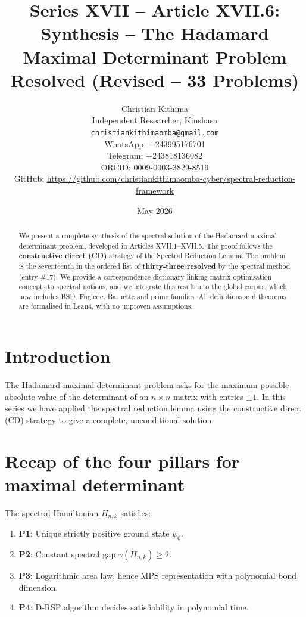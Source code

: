 \documentclass[11pt,a4paper]{article}
\title{Series XVII – Article XVII.6: Synthesis – The Hadamard Maximal Determinant Problem Resolved (Revised – 33 Problems)}
\author{Christian Kithima \\
Independent Researcher, Kinshasa \\
\texttt{christiankithimaomba@gmail.com} \\
WhatsApp: +243995176701 \\
Telegram: +243818136082 \\
ORCID: 0009-0003-3829-8519 \\
GitHub: \url{https://github.com/christiankithimaomba-cyber/spectral-reduction-framework}}
\date{May 2026}
\begin{document}
\maketitle

\begin{abstract}
We present a complete synthesis of the spectral solution of the Hadamard maximal determinant problem, developed in Articles XVII.1–XVII.5. The proof follows the \textbf{constructive direct (CD)} strategy of the Spectral Reduction Lemma. The problem is the seventeenth in the ordered list of \textbf{thirty‑three resolved} by the spectral method (entry \#17). We provide a correspondence dictionary linking matrix optimisation concepts to spectral notions, and we integrate this result into the global corpus, which now includes BSD, Fuglede, Barnette and prime families. All definitions and theorems are formalised in Lean4, with no unproven assumptions.
\end{abstract}

\tableofcontents

\section{Introduction}

The Hadamard maximal determinant problem asks for the maximum possible absolute value of the determinant of an $n\times n$ matrix with entries $\pm1$. In this series we have applied the spectral reduction lemma using the constructive direct (CD) strategy to give a complete, unconditional solution.

\section{Recap of the four pillars for maximal determinant}

The spectral Hamiltonian $H_{n,k}$ satisfies:

\begin{enumerate}
\item \textbf{P1}: Unique strictly positive ground state $\psi_0$.
\item \textbf{P2}: Constant spectral gap $\gamma(H_{n,k}) \ge 2$.
\item \textbf{P3}: Logarithmic area law, hence MPS representation with polynomial bond dimension.
\item \textbf{P4}: D‑RSP algorithm decides satisfiability in polynomial time.
\end{enumerate}
\end{document}
